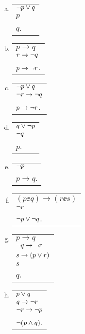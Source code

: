 \begin{enumerate}[{\bf 1.}]
\begin{multicols}{3}
\begin{enumerate}[a)]
\item \begin{tabular}{l}
$\lnot p\vee q$ \\
\underline{$p$} \\
$q$.
\end{tabular}

\item \begin{tabular}{l}
$p\to q$ \\
\underline{$r\to \lnot q$} \\
$p\to\lnot r$.
\end{tabular}

\item \begin{tabular}{l}
$\lnot p\vee q$ \\
\underline{$\lnot r\to \lnot q$} \\
$p\to\lnot r$.
\end{tabular}

\item \begin{tabular}{l}
$q\vee\lnot p$ \\
\underline{$\lnot q$} \\
$p$.
\end{tabular}

\item \begin{tabular}{l}
\underline{$\lnot p$} \\
$p\to q$.
\end{tabular}

\item \begin{tabular}{l}
$(p\ee q)\to(r\ee s)$ \\
\underline{$\lnot r$} \\
$\lnot p\vee\lnot q$.
\end{tabular}

\item \begin{tabular}{l}
$p\to q$ \\
$\lnot q \to \lnot r$ \\
$s\to(p\vee r)$ \\
\underline{$s$} \\
$q$.
\end{tabular}

\item \begin{tabular}{l}
$p\vee q$ \\
$q\to \lnot r$ \\
\underline{$\lnot r\to\lnot p$} \\
$\lnot(p\wedge q)$.
\end{tabular}


\end{enumerate}
\end{multicols}
\end{enumerate}
